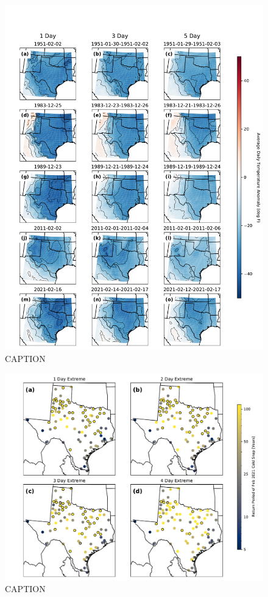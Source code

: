 \documentclass[12pt]{iopart}
\begin{document}
\begin{figure}
  \centering
  \includegraphics[width=\textwidth]{historic_events_era5_TX.pdf}
  \caption{CAPTION}\label{fig:historic_tx}
\end{figure}


\begin{figure}
  \centering
  \includegraphics[width=\textwidth]{local_rt_ghcnd.pdf}
  \caption{CAPTION}\label{fig:local_ghcnd}
\end{figure}
\end{document}
